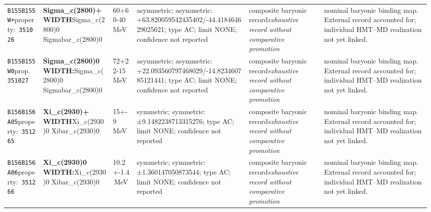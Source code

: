 \begin{landscape}
\begin{longtable}{L{1.85cm}L{4.45cm}L{2.35cm}L{4.05cm}L{3.35cm}L{7.15cm}}
\texttt{B155}\newline \texttt{B155W+}\newline property:\ \texttt{351026} & \textbf{Sigma\_\allowbreak{}c(2800)+ WIDTH}\newline Sigma\_\allowbreak{}c(2800)0 \textbar{}\allowbreak{} Sigmabar\_\allowbreak{}c(2800)0 & 60+60-40\,MeV & asymmetric; asymmetric: +63.820059542435402/-44.418464629025621; type AC; limit NONE; confidence not reported & composite baryonic record\newline \emph{exhaustive record without comparative promotion} & nominal baryonic binding map. External record accounted for; individual HMT--MD realization not yet linked. \\
\texttt{B155}\newline \texttt{B155W0}\newline prop.\ \texttt{351027} & \textbf{Sigma\_\allowbreak{}c(2800)0 WIDTH:}\newline Sigma\_\allowbreak{}c(2800)0 \textbar{}\allowbreak{} Sigmabar\_\allowbreak{}c(2800)0 & 72+22-15\,MeV & asymmetric; asymmetric: +22.093560797468029/-14.823460785121441; type AC; limit NONE; confidence not reported & composite baryonic record\newline \emph{exhaustive record without comparative promotion} & nominal baryonic binding map. External record accounted for; individual HMT--MD realization not yet linked. \\
\texttt{B156}\newline \texttt{B156A05}\newline property:\ \texttt{351265} & \textbf{Xi\_\allowbreak{}c(2930)+ WIDTH}\newline Xi\_\allowbreak{}c(2930)0 \textbar{}\allowbreak{} Xibar\_\allowbreak{}c(2930)0 & 15+-9\,MeV & symmetric; symmetric: ±9.1482238713315276; type AC; limit NONE; confidence not reported & composite baryonic record\newline \emph{exhaustive record without comparative promotion} & nominal baryonic binding map. External record accounted for; individual HMT--MD realization not yet linked. \\
\texttt{B156}\newline \texttt{B156A06}\newline property:\ \texttt{351266} & \textbf{Xi\_\allowbreak{}c(2930)0 WIDTH:}\newline Xi\_\allowbreak{}c(2930)0 \textbar{}\allowbreak{} Xibar\_\allowbreak{}c(2930)0 & 10.2+-1.4\,MeV & symmetric; symmetric: ±1.360147050873544; type AC; limit NONE; confidence not reported & composite baryonic record\newline \emph{exhaustive record without comparative promotion} & nominal baryonic binding map. External record accounted for; individual HMT--MD realization not yet linked. \\

\end{longtable}
\end{landscape}
